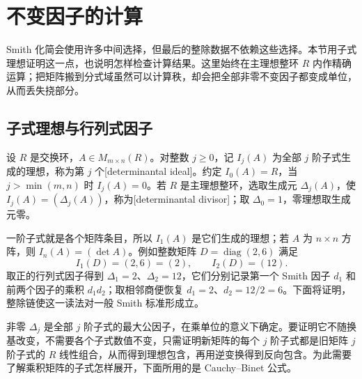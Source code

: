 
\section{不变因子的计算}
\label{b2:sec:0402}


Smith 化简会使用许多中间选择，但最后的整除数据不依赖这些选择。本节用子式理想证明这一点，也说明怎样检查计算结果。这里始终在主理想整环 \(R\) 内作精确运算；把矩阵搬到分式域虽然可以计算秩，却会把全部非零不变因子都变成单位，从而丢失挠部分。

\subsection{子式理想与行列式因子}
\label{b2:subsec:0402:01}

\begin{definition}\label{b2:def:determinantal-ideal}
	设 \(R\) 是交换环，\(A\in M_{m\times n}(R)\)。对整数 \(j\ge0\)，记 \(I_j(A)\) 为全部 \(j\) 阶子式生成的理想，称为第 \(j\) 个[determinantal ideal]。约定 \(I_0(A)=R\)，当 \(j>\min(m,n)\) 时 \(I_j(A)=0\)。若 \(R\) 是主理想整环，选取生成元 \(\Delta_j(A)\)，使 \(I_j(A)=(\Delta_j(A))\)，称为[determinantal divisor]；取 \(\Delta_0=1\)，零理想取生成元零。
\end{definition}

一阶子式就是各个矩阵条目，所以 \(I_1(A)\) 是它们生成的理想；若 \(A\) 为 \(n\times n\) 方阵，则 \(I_n(A)=(\det A)\)。例如整数矩阵 \(D=\operatorname{diag}(2,6)\) 满足
\[
	I_1(D)=(2,6)=(2),\qquad I_2(D)=(12).
\]
取正的行列式因子得到 \(\Delta_1=2\)、\(\Delta_2=12\)，它们分别记录第一个 Smith 因子 \(d_1\) 和前两个因子的乘积 \(d_1d_2\)；取相邻商便恢复 \(d_1=2\)、\(d_2=12/2=6\)。下面将证明，整除链使这一读法对一般 Smith 标准形成立。

\ProseParagraphBreak
非零 \(\Delta_j\) 是全部 \(j\) 阶子式的最大公因子，在乘单位的意义下确定。要证明它不随换基改变，不需要各个子式数值不变，只需证明新矩阵的每个 \(j\) 阶子式都是旧矩阵 \(j\) 阶子式的 \(R\) 线性组合，从而得到理想包含，再用逆变换得到反向包含。为此需要了解乘积矩阵的子式怎样展开，下面所用的是 Cauchy--Binet 公式。

